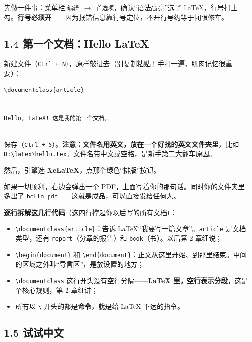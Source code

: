 先做一件事：菜单栏 \texttt{编辑 \ensuremath{\rightarrow} 首选项}，确认“语法高亮”选了 LaTeX，行号打上勾。\textbf{行号必须开}——因为报错信息靠行号定位，不开行号约等于闭眼修车。

\subsection*{1.4 第一个文档：Hello LaTeX}

新建文件（\texttt{Ctrl + N}），原样敲进去（别复制粘贴！手打一遍，肌肉记忆很重要）：

\begin{lstlisting}
\documentclass{article}


Hello, LaTeX! 这是我的第一个文档。


\end{lstlisting}

保存（\texttt{Ctrl + S}）。\textbf{注意：文件名用英文，放在一个好找的英文文件夹里}，比如 \texttt{D:\textbackslash{}latex\textbackslash{}hello.tex}。文件名带中文或空格，是新手第二大翻车原因。

然后，引擎选 \textbf{XeLaTeX}，点那个绿色“排版”按钮。

如果一切顺利，右边会弹出一个 PDF，上面写着你的那句话。同时你的文件夹里多出了 \texttt{hello.pdf}——这就是成品，可以直接发给任何人。

\textbf{逐行拆解这几行代码}（这四行撑起你以后写的所有文档）：

\begin{itemize}
\setlength{\itemsep}{2pt}
\item \texttt{\textbackslash{}documentclass\{article\}}：告诉 LaTeX“我要写一篇文章”。\texttt{article} 是文档类型，还有 \texttt{report}（分章的报告）和 \texttt{book}（书）。以后第 2 章细说；
\item \texttt{\textbackslash{}begin\{document\}} 和 \texttt{\textbackslash{}end\{document\}}：正文从这里开始、到那里结束。中间的区域之外叫“导言区”，是放设置的地方；
\item \texttt{\textbackslash{}documentclass} 这行开头没有空行分隔——\textbf{LaTeX 里，空行表示分段}，这是个核心规则，第 2 章细讲；
\item 所有以 \texttt{\textbackslash{}} 开头的都是\textbf{命令}，就是给 LaTeX 下达的指令。
\end{itemize}

\subsection*{1.5 试试中文}

